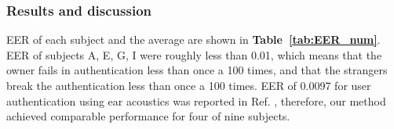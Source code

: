 \documentclass[sigchi,authordraft]{acmart}
\newcommand\figref[1]{\textbf{Figure~\ref{fig:#1}}}
\newcommand\tabref[1]{\textbf{Table~\ref{tab:#1}}}
\begin{document}
\subsubsection{Results and discussion}
EER of each subject and the average are shown in \tabref{EER_num}. %
EER of subjects A, E, G, I were roughly less than 0.01, which means that the owner fails in authentication less than once a 100 times, and that the strangers break the authentication less than once a 100 times. EER of 0.0097 for user authentication using ear acoustics was reported in Ref. \cite{ear_auth}, therefore, our method achieved comparable performance for four of nine subjects. 




\end{document}
